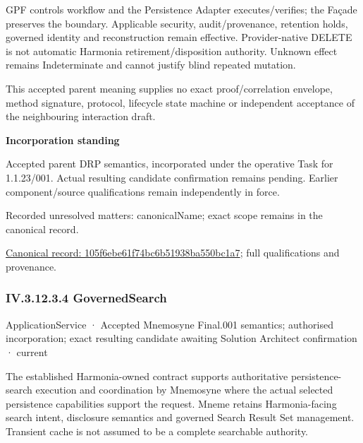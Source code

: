 GPF controls workflow and the Persistence Adapter executes/verifies; the Façade preserves the boundary. Applicable security, audit/provenance, retention holds, governed identity and reconstruction remain effective. Provider-native DELETE is not automatic Harmonia retirement/disposition authority. Unknown effect remains Indeterminate and cannot justify blind repeated mutation.



This accepted parent meaning supplies no exact proof/correlation envelope, method signature, protocol, lifecycle state machine or independent acceptance of the neighbouring interaction draft.



\par\medskip\textbf{Incorporation standing}\par


Accepted parent DRP semantics, incorporated under the operative Task for 1.1.23/001. Actual resulting candidate confirmation remains pending. Earlier component/source qualifications remain independently in force.


{\small Recorded unresolved matters: canonicalName; exact scope remains in the canonical record.}\par
{\footnotesize \href{../../../../continuum/application/application-service/105f6ebe61f74bc6b51938ba550bc1a7.md}{Canonical record: 105f6ebe61f74bc6b51938ba550bc1a7}; full qualifications and provenance.}\par
\subsubsection*{IV.3.12.3.4 GovernedSearch}
\label{navigation:IV.3.12.3.4}

\label{element:dcb31810ae134818adeeba9b27bd2f30}
{\small ApplicationService · Accepted Mnemosyne Final.001 semantics; authorised incorporation; exact resulting candidate awaiting Solution Architect confirmation · current}\par

The established Harmonia-owned contract supports authoritative persistence-search execution and coordination by Mnemosyne where the actual selected persistence capabilities support the request. Mneme retains Harmonia-facing search intent, disclosure semantics and governed Search Result Set management. Transient cache is not assumed to be a complete searchable authority.



